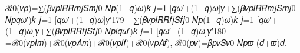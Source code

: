 ℛ0(𝑣𝑝)=∑(𝛽𝑣𝑝𝐼𝑅𝑅𝑚𝑗𝑆𝑚𝑗0
𝑁𝑝(1−𝑞)𝜔)𝑘
𝑗=1
[𝑞𝜔′+(1−𝑞)𝜔]𝛾+∑(𝛽𝑣𝑝𝐼𝑅𝑅𝑚𝑗𝑆𝑚𝑗0
𝑁𝑝𝑞𝜔′)𝑘
𝑗=1
[𝑞𝜔′+(1−𝑞)𝜔]𝛾′179
+∑(𝛽𝑣𝑝𝐼𝑅𝑅𝑓𝑗𝑆𝑓𝑗0
𝑁𝑝(1−𝑞)𝜔)𝑘
𝑗=1
[𝑞𝜔′+(1−𝑞)𝜔]𝛾+∑(𝛽𝑣𝑝𝐼𝑅𝑅𝑓𝑗𝑆𝑓𝑗0
𝑁𝑝𝑖𝑞𝜔′)𝑘
𝑗=1
[𝑞𝜔′+(1−𝑞)𝜔]𝛾′180
=ℛ0(𝑣𝑝𝐼𝑚)+ℛ0(𝑣𝑝𝐴𝑚)+ℛ0(𝑣𝑝𝐼𝑓)+ℛ0(𝑣𝑝𝐴𝑓),
ℛ0(𝑝𝑣)=𝛽𝑝𝑣𝑆𝑣0
𝑁𝑝𝜛
(𝑑+𝜛)𝑑.